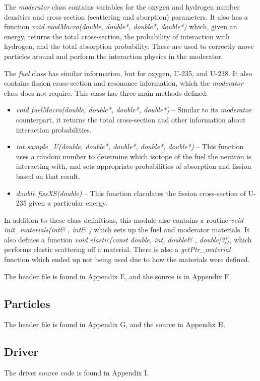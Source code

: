 The \textit{moderator} class contains variables for the oxygen and hydrogen number densities and cross-section (scattering and aborption) parameters.  It also has a function \textit{void modMacro(double, double*, double*, double*)} which, given an energy, returns the total cross-section, the probability of interaction with hydrogen, and the total absorption probability.  These are used to correctly move particles around and perform the interaction physics in the moderator.

The \textit{fuel} class has similar information, but for oxygen, U-235, and U-238.  It also contains fission cross-section and resonance information, which the \textit{moderator} class does not require.  This class has three main methods defined:

\begin{itemize}
\item \textit{void fuelMacro(double, double*, double*, double*)} -- Similar to its \textit{moderator} counterpart, it returns the total cross-section and other information about interaction probabilities.
\item \textit{int sample{\_}U(double, double*, double*, double*, double*)} -- This function uses a random number to determine which isotope of the fuel the neutron is interacting with, and sets appropriate probabilities of absorption and fission based on that result.
\item \textit{double fissXS(double)} -- This function claculates the fission cross-section of U-235 given a particular energy.
\end{itemize}

In addition to these class definitions, this module also contains a routine \textit{void init{\_}materials(int\& , int\& )} which sets up the fuel and moderator materials.  It also defines a function \textit{void elastic(const double, int, double\& , double[3])}, which performs elastic scattering off a material.  There is also a \textit{getPtr{\_}material} function which ended up not being used due to how the materials were defined.

The header file is found in Appendix E, and the source is in Appendix F.

\subsection{Particles}\label{ss:particles}

The header file is found in Appendix G, and the source in Appendix H.

\subsection{Driver}\label{ss:driver}

The driver source code is found in Appendix I.

